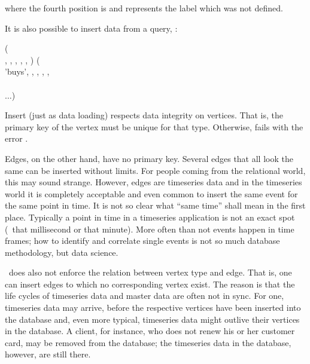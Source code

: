 where the fourth position is  and represents
the label which was not defined.

It is also possible  to insert data from
a query, \eg:

\begin{minipage}{\textwidth}
  ( \\
                      ,
                      ,
                      ,
                      ,
                      ,
                      ) (\\
\hspace*{0.2cm} 'buys', , 
                         ,
                         ,
                         ,
                          \\
\hspace*{0.35cm}  \\
\hspace*{0.2cm} $\dots$)
\end{minipage}

Insert (just as data loading) respects data integrity
on vertices. That is, the primary key of the vertex
must be unique for that type. Otherwise, 
fails with the error .

Edges, on the other hand, have no primary key.
Several edges that all look the same can be inserted
without limits. For people coming from the relational
world, this may sound strange. However, edges are
timeseries data and in the timeseries world
it is completely acceptable and
even common to insert the same event for the same
point in time. It is not so clear 
what ``same time'' shall mean in the first place.
Typically a point in time in a timeseries application
is not an exact spot (\eg\ that millisecond or that
minute). More often than not events happen in
time frames; how to identify and correlate single events
is not so much database methodology, but data science.

\nowdb\ does also not enforce the relation between
vertex type and edge. That is, one can insert edges
to which no corresponding vertex exist.
The reason is that the life cycles of timeseries data
and master data are often not in sync.
For one, timeseries data may arrive, before the
respective vertices have been inserted into the database
and, even more typical, timeseries data might
outlive their vertices in the database.
A client, for instance, who does not renew his or her
customer card, may be removed from the database;
the timeseries data in the database, however,
are still there.

